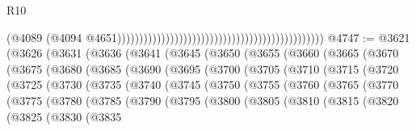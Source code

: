 \begin{lexlean}{R10}
\begin{coremodule}
{{{{{{{{{{{{{{{{{{{{{{{{{{{{{{{{{{{{{{{{{{{{{{{{{{{{{{{{{{{{{{{{{{{{{{{{{{{{{{{{{{{{                                                                                              (@4089
                                                                                                (@4094
                                                                                                  @4651)))))))))))))))))))))))))))))))))))))))))))))))
@4747 := @3621
    (@3626
      (@3631
        (@3636
          (@3641
            (@3645
              (@3650
                (@3655
                  (@3660
                    (@3665
                      (@3670
                        (@3675
                          (@3680
                            (@3685
                              (@3690
                                (@3695
                                  (@3700
                                    (@3705
                                      (@3710
                                        (@3715
                                          (@3720
                                            (@3725
                                              (@3730
                                                (@3735
                                                  (@3740
                                                    (@3745
                                                      (@3750
                                                        (@3755
                                                          (@3760
                                                            (@3765
                                                              (@3770
                                                                (@3775
                                                                  (@3780
                                                                    (@3785
                                                                      (@3790
                                                                        (@3795
                                                                          (@3800
                                                                            (@3805
                                                                              (@3810
                                                                                (@3815
                                                                                  (@3820
                                                                                    (@3825
                                                                                      (@3830
                                                                                        (@3835
}}}}}}}}}}}}}}}}}}}}}}}}}}}}}}}}}}}}}}}}}}}}}}}}}}}}}}}}}}}}}}}}}}}}}}}}}}}}}}}}}}}}
\end{coremodule}
\end{lexlean}
